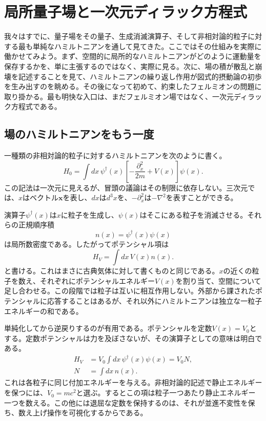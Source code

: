 \chapter{局所量子場と一次元ディラック方程式}

我々はすでに、量子場をその量子、生成消滅演算子、そして非相対論的粒子に対する最も単純なハミルトニアンを通して見てきた。ここではその仕組みを実際に働かせてみよう。まず、空間的に局所的なハミルトニアンがどのように運動量を保存するかを、単に主張するのではなく、実際に見る。次に、場の積が散乱と崩壊を記述することを見て、ハミルトニアンの繰り返し作用が図式的摂動論の初歩を生み出すのを眺める。その後になって初めて、約束したフェルミオンの問題に取り掛かる。最も明快な入口は、まだフェルミオン場ではなく、一次元ディラック方程式である。

\section{場のハミルトニアンをもう一度}

一種類の非相対論的粒子に対するハミルトニアンを次のように書く。
\begin{equation}
H_0=\int dx\,
\psi^\dagger(x)
\left[-\frac{\partial_x^2}{2m}+V(x)\right]
\psi(x).
\label{eq:l9-nonrel-hamiltonian}
\end{equation}
この記法は一次元に見えるが、冒頭の議論はその制限に依存しない。三次元では、\(x\)はベクトル\(\mathbf{x}\)を表し、\(dx\)は\(d^3x\)を、\(-\partial_x^2\)は\(-\nabla^2\)を表すことができる。

演算子\(\psi^\dagger(x)\)は\(x\)に粒子を生成し、\(\psi(x)\)はそこにある粒子を消滅させる。それらの正規順序積
\begin{equation}
n(x)=\psi^\dagger(x)\psi(x)
\end{equation}
は局所数密度である。したがってポテンシャル項は
\begin{equation}
H_V=\int dx\,V(x)n(x).
\end{equation}
と書ける。これはまさに古典気体に対して書くものと同じである。\(x\)の近くの粒子を数え、それぞれにポテンシャルエネルギー\(V(x)\)を割り当て、空間について足し合わせる。この段階では粒子は互いに相互作用しない。外部から課されたポテンシャルに応答することはあるが、それ以外にハミルトニアンは独立な一粒子エネルギーの和である。

単純化してから逆戻りするのが有用である。ポテンシャルを定数\(V(x)=V_0\)とする。定数ポテンシャルは力を及ぼさないが、その演算子としての意味は明白である。
\begin{equation}
\begin{aligned}
H_V&=V_0\int dx\,\psi^\dagger(x)\psi(x)=V_0N,\\
N&=\int dx\,n(x).
\end{aligned}
\end{equation}
これは各粒子に同じ付加エネルギーを与える。非相対論的記述で静止エネルギーを保つには、\(V_0=mc^2\)と選ぶ。するとこの項は粒子一つあたり静止エネルギー一つを数える。この他には退屈な定数を保持するのは、それが並進不変性を保ち、数え上げ操作を可視化するからである。

